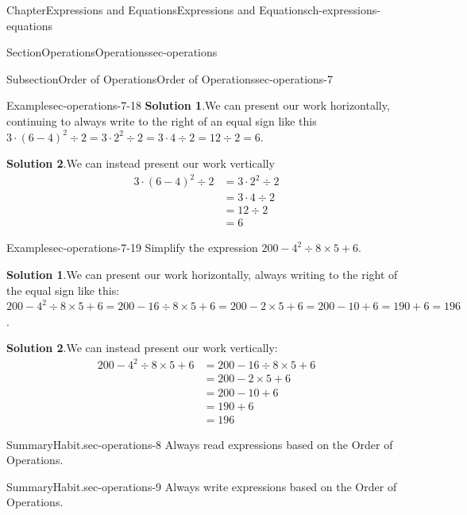 \documentclass[twoside,11pt,]{book}
\newcommand{\blocktitlefont}{\relax}
\numberwithin{equation}{chapter}
\newcommand{\amp}{&}
\begin{document}
\begin{chapterptx}{Chapter}{Expressions and Equations}{}{Expressions and Equations}{}{}{ch-expressions-equations}
\begin{sectionptx}{Section}{Operations}{}{Operations}{}{}{sec-operations}
\begin{subsectionptx}{Subsection}{Order of Operations}{}{Order of Operations}{}{}{sec-operations-7}
\begin{example}{Example}{}{sec-operations-7-18}
\noindent\textbf{\blocktitlefont Solution 1}.\hypertarget{sec-operations-7-18-2}{}\quad{}We can present our work horizontally, continuing to always write to the right of an equal sign like this \(3 \cdot (6 - 4)^2 \div 2 = 3 \cdot 2^2 \div 2 = 3 \cdot 4 \div 2 = 12 \div 2 = 6\).%
\par\smallskip%
\noindent\textbf{\blocktitlefont Solution 2}.\hypertarget{sec-operations-7-18-3}{}\quad{}We can instead present our work vertically%
\begin{align*}
3 \cdot (6 - 4)^2 \div 2 \amp = 3 \cdot 2^2 \div 2\\
\amp = 3 \cdot 4 \div 2\\
\amp = 12 \div 2\\
\amp = 6
\end{align*}
%
\end{example}
\begin{example}{Example}{}{sec-operations-7-19}%
Simplify the expression \(200 - 4^2 \div 8 \times 5 + 6\).%
\par\smallskip%
\noindent\textbf{\blocktitlefont Solution 1}.\hypertarget{sec-operations-7-19-2}{}\quad{}We can present our work horizontally, always writing to the right of the equal sign like this: \(200 - 4^2 \div 8 \times 5 + 6 
= 200 - 16 \div 8 \times 5 + 6 
= 200 - 2 \times 5 + 6 
= 200 - 10 + 6 
= 190 + 6 
= 196\).%
\par\smallskip%
\noindent\textbf{\blocktitlefont Solution 2}.\hypertarget{sec-operations-7-19-3}{}\quad{}We can instead present our work vertically:%
\begin{align*}
200 - 4^2 \div 8 \times 5 + 6 \amp = 200 - 16 \div 8 \times 5 + 6\\
\amp = 200 - 2 \times 5 + 6\\
\amp = 200 - 10 + 6\\
\amp = 190 + 6\\
\amp = 196
\end{align*}
%
\end{example}
\end{subsectionptx}
\begin{assemblage}{Summary}{Habit.}{sec-operations-8}%
Always read expressions based on the Order of Operations.%
\end{assemblage}
\begin{assemblage}{Summary}{Habit.}{sec-operations-9}%
Always write expressions based on the Order of Operations.%
\end{assemblage}
%
%
\typeout{************************************************}

\end{sectionptx}
\end{chapterptx}
\end{document}
